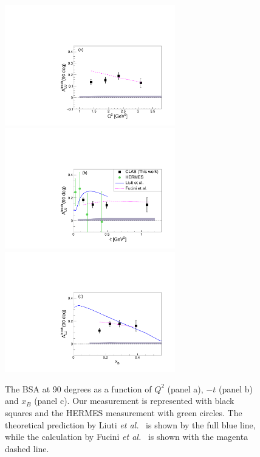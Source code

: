 \documentclass[aps,prc,preprint,superscriptaddress]{revtex4}
\begin{document}
\begin{figure}[tbp!]
\center
\includegraphics[width=7.4cm]{ALU_90_p_vs_Q2_shortscenrario.pdf}
\includegraphics[width=7.4cm]{ALU_90_p_vs_t_shortscenrario.pdf}
\includegraphics[width=7.4cm]{ALU_90_p_vs_x_shortscenrario.pdf}
	\caption{The BSA at 90 degrees as a function of $Q^2$ (panel a), $-t$ (panel b) 
        and $x_B$ (panel c). Our measurement is represented with black squares and the HERMES 
	measurement \cite{Airapetian:2009cga} with green circles. The theoretical prediction 
	by Liuti {\it et al.}~\cite{Liuti:2005gi,GonzalezHernandez:2012jv} is shown 
	by the full blue line, while the calculation by Fucini 
	{\it et al.}~\cite{Fucini:2019xlc} is shown with the magenta dashed line.}
\label{fig:IncALU}
\end{figure}
\end{document}

